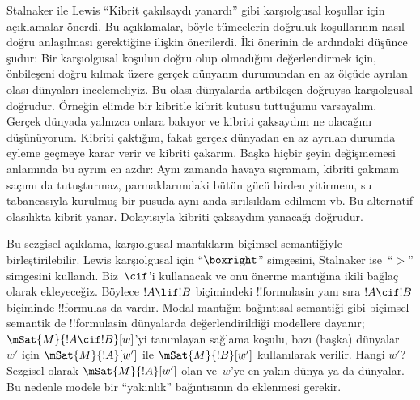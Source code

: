 



Stalnaker ile Lewis ``Kibrit çakılsaydı yanardı'' gibi karşıolgusal koşullar
için açıklamalar önerdi. Bu açıklamalar, böyle tümcelerin doğruluk
koşullarının nasıl doğru anlaşılması gerektiğine ilişkin önerilerdi. İki
önerinin de ardındaki düşünce şudur: Bir karşıolgusal koşulun doğru olup
olmadığını değerlendirmek için, önbileşeni doğru kılmak üzere gerçek dünyanın
durumundan en az ölçüde ayrılan olası dünyaları incelemeliyiz. Bu olası
dünyalarda artbileşen doğruysa karşıolgusal doğrudur. Örneğin elimde bir
kibritle kibrit kutusu tuttuğumu varsayalım. Gerçek dünyada yalnızca onlara
bakıyor ve kibriti çaksaydım ne olacağını düşünüyorum. Kibriti çaktığım, fakat
gerçek dünyadan en az ayrılan durumda eyleme geçmeye karar verir ve kibriti
çakarım. Başka hiçbir şeyin değişmemesi anlamında bu ayrım en azdır: Aynı
zamanda havaya sıçramam, kibriti çakmam saçımı da tutuşturmaz, parmaklarımdaki
bütün gücü birden yitirmem, su tabancasıyla kurulmuş bir pusuda aynı anda
sırılsıklam edilmem vb. Bu alternatif olasılıkta kibrit yanar. Dolayısıyla
kibriti çaksaydım yanacağı doğrudur.

Bu sezgisel açıklama, karşıolgusal mantıkların biçimsel semantiğiyle
birleştirilebilir. Lewis karşıolgusal için ``$\boxright$'' simgesini,
Stalnaker ise~``$>$'' simgesini kullandı. Biz~$\cif$'i kullanacak ve onu
önerme mantığına ikili bağlaç olarak ekleyeceğiz. Böylece $!A\lif !B$
biçimindeki !!{formula}s{}in yanı sıra $!A\cif !B$ biçiminde !!{formula}s da
vardır. Modal mantığın bağıntısal semantiği gibi biçimsel semantik de
!!{formula}s{}in dünyalarda değerlendirildiği modellere dayanır;
$\mSat{M}{!A\cif !B}[w]$'yi tanımlayan sağlama koşulu, bazı (başka)
dünyalar~$w'$ için $\mSat{M}{!A}[w']$ ile $\mSat{M}{!B}[w']$ kullanılarak
verilir. Hangi $w'$? Sezgisel olarak $\mSat{M}{!A}[w']$ olan ve~$w$'ye en
yakın dünya ya da dünyalar. Bu nedenle modele bir ``yakınlık'' bağıntısının
da eklenmesi gerekir.

